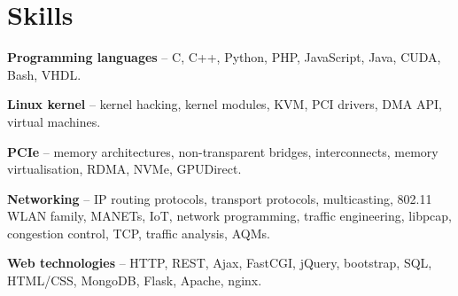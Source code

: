 \section{Skills}
\begin{small}
	\parbox[t][][t]{\linewidth}{
		\textbf{Programming languages} -- C, C++, Python, PHP, JavaScript, Java, CUDA, Bash, VHDL.
		\smallbreak
	}
	\parbox[t][][t]{\linewidth}{
		\textbf{Linux kernel} -- kernel hacking, kernel modules,
		KVM, PCI drivers, DMA API, virtual machines.
		\smallbreak
	}
	\parbox[t][][t]{\linewidth}{
		\textbf{PCIe} -- memory architectures, non-transparent bridges, 
		interconnects, memory virtualisation, RDMA, NVMe, GPUDirect.
		\smallbreak
	}
	\parbox[t][][t]{\linewidth}{
		\textbf{Networking} -- IP routing protocols, transport protocols,
		multicasting, 802.11 WLAN family, MANETs, IoT, network programming, 
		traffic engineering, libpcap, congestion control, TCP, traffic
		analysis, AQMs.
		\smallbreak
	}
	\parbox[t][][t]{\linewidth}{
		\textbf{Web technologies} -- HTTP, REST, Ajax, FastCGI, jQuery,
		bootstrap, SQL, HTML/CSS, MongoDB, Flask, Apache, nginx.
		\smallbreak
	}
\end{small}

